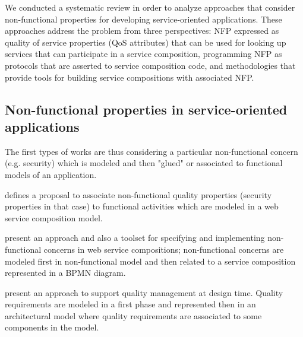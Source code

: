 
We conducted a systematic review \cite{placidoPhDThesis2012} in order to analyze approaches that consider non-functional properties for developing service-oriented applications. These  approaches address the problem from three perspectives: NFP expressed as quality of service properties (QoS attributes) that can be used for looking up services that can participate in a service composition, programming NFP as protocols that are asserted to service composition code, and methodologies that provide tools for building service compositions with associated NFP. 


\subsection{Non-functional properties in service-oriented applications}


The first types of works are thus considering a particular non-functional concern (e.g. security) which is modeled and then "glued" or associated to functional models of an application.  

\cite{CholletL09} defines a proposal to associate non-functional quality properties (security properties in that case) to functional activities which are modeled in a web service composition model.

\cite{SchmelingCM11} present an approach and also a toolset for specifying and implementing non-functional concerns in web service compositions; non-functional concerns are modeled first in non-functional model and then related to a service composition represented in a BPMN diagram. 

 \cite{OvaskaEHPA10} present an approach to support quality management at design time. Quality requirements are modeled in a first phase and represented then in an architectural model where quality requirements are associated to some components in the model. 
 
 

